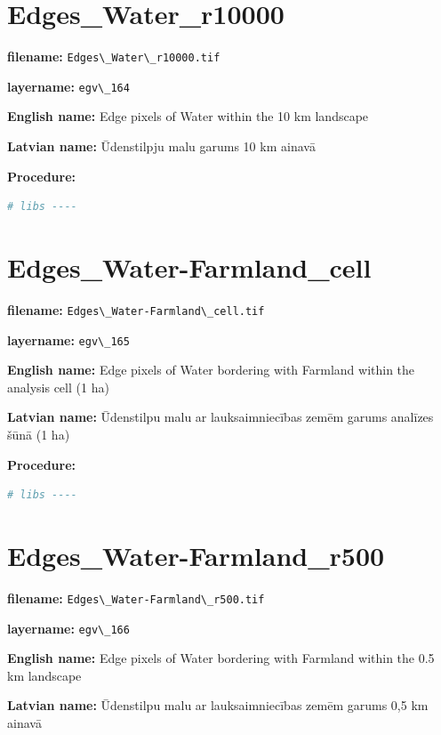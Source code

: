 \documentclass[
]{book}
\newcommand{\passthrough}[1]{#1}
\begin{document}
\section{Edges\_Water\_r10000}\label{ch06.164}

\textbf{filename:} \passthrough{\lstinline!Edges\_Water\_r10000.tif!}

\textbf{layername:} \passthrough{\lstinline!egv\_164!}

\textbf{English name:} Edge pixels of Water within the 10 km landscape

\textbf{Latvian name:} Ūdenstilpju malu garums 10 km ainavā

\textbf{Procedure:}

\begin{lstlisting}[language=R]
# libs ----
\end{lstlisting}

\section{Edges\_Water-Farmland\_cell}\label{ch06.165}

\textbf{filename:} \passthrough{\lstinline!Edges\_Water-Farmland\_cell.tif!}

\textbf{layername:} \passthrough{\lstinline!egv\_165!}

\textbf{English name:} Edge pixels of Water bordering with Farmland within the analysis cell (1 ha)

\textbf{Latvian name:} Ūdenstilpu malu ar lauksaimniecības zemēm garums analīzes šūnā (1 ha)

\textbf{Procedure:}

\begin{lstlisting}[language=R]
# libs ----
\end{lstlisting}

\section{Edges\_Water-Farmland\_r500}\label{ch06.166}

\textbf{filename:} \passthrough{\lstinline!Edges\_Water-Farmland\_r500.tif!}

\textbf{layername:} \passthrough{\lstinline!egv\_166!}

\textbf{English name:} Edge pixels of Water bordering with Farmland within the 0.5 km landscape

\textbf{Latvian name:} Ūdenstilpu malu ar lauksaimniecības zemēm garums 0,5 km ainavā
\end{document}
